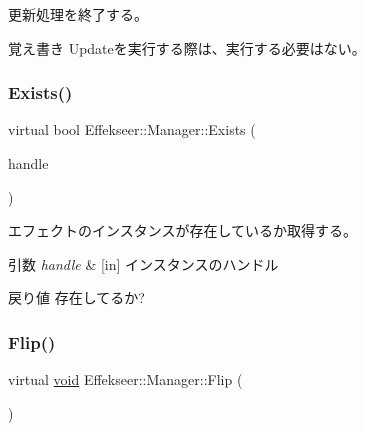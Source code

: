 更新処理を終了する。 

\begin{DoxyNote}{覚え書き}
Updateを実行する際は、実行する必要はない。 
\end{DoxyNote}
\mbox{\label{class_effekseer_1_1_manager_ad95297e9170c9f9874eb6bf951aa5dc0}} 
\subsubsection{\texorpdfstring{Exists()}{Exists()}}
{\footnotesize\ttfamily virtual bool Effekseer\+::\+Manager\+::\+Exists (\begin{DoxyParamCaption}\item[{\mbox{\hyperlink{namespace_effekseer_afba58b8d812da862190e9bbfc040824a}{Handle}}}]{handle }\end{DoxyParamCaption})\hspace{0.3cm}{\ttfamily [pure virtual]}}



エフェクトのインスタンスが存在しているか取得する。 


\begin{DoxyParams}{引数}
{\em handle} & \mbox{[}in\mbox{]} インスタンスのハンドル \\
\hline
\end{DoxyParams}
\begin{DoxyReturn}{戻り値}
存在してるか? 
\end{DoxyReturn}
\mbox{\label{class_effekseer_1_1_manager_ab810f714df5d12c566664183f365cbf4}} 
\subsubsection{\texorpdfstring{Flip()}{Flip()}}
{\footnotesize\ttfamily virtual \mbox{\hyperlink{namespace_effekseer_ab34c4088e512200cf4c2716f168deb56}{void}} Effekseer\+::\+Manager\+::\+Flip (\begin{DoxyParamCaption}{ }\end{DoxyParamCaption})\hspace{0.3cm}{\ttfamily [pure virtual]}}



